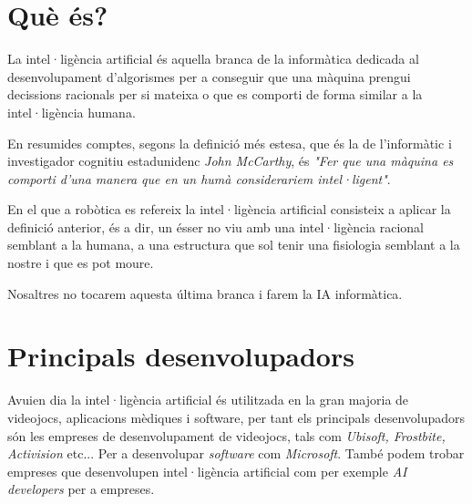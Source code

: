 \section{Què és?}

La intel·ligència artificial és aquella branca de la informàtica dedicada al
desenvolupament d'algorismes per a conseguir que una màquina prengui decissions
 racionals per si mateixa o que es comporti de forma similar a la intel·ligència humana.

En resumides comptes, segons la definició més estesa, que és la de l'informàtic i
investigador cognitiu estadunidenc \emph{John McCarthy}, és \emph{"Fer que una màquina
es comporti d'una manera que en un humà considerariem intel·ligent"}.

En el que a robòtica es refereix la intel·ligència artificial consisteix a aplicar la
definició anterior, és a dir, un ésser no viu amb una intel·ligència racional semblant
a la humana, a una estructura que sol tenir una fisiologia semblant a la nostre i que
es pot moure.
\cite{definiciondeia} \cite{wikiia} \cite{monoia}

Nosaltres no tocarem aquesta última branca i farem la IA informàtica.

\section{Principals desenvolupadors}

Avuien dia la intel·ligència artificial és utilitzada en la gran majoria de videojocs,
aplicacions mèdiques i software, per tant els principals desenvolupadors són les
empreses de desenvolupament de videojocs, tals com \emph{Ubisoft, Frostbite, Activision}
etc... Per a desenvolupar \emph{software} com \emph{Microsoft}. També podem trobar
empreses que desenvolupen intel·ligència artificial com per exemple \emph{AI developers}
\cite{aidevelopers}per a empreses.





